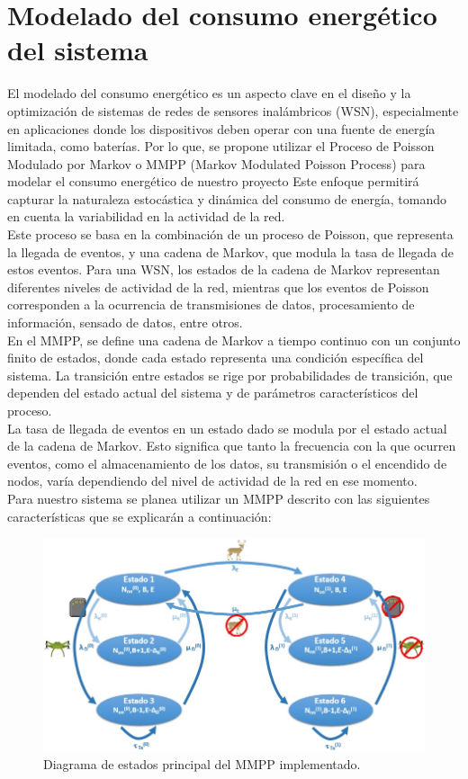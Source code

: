 \section{Modelado del consumo energético del sistema}
El modelado del consumo energético es un aspecto clave en el diseño y la optimización de sistemas de redes de sensores inalámbricos (WSN), especialmente en aplicaciones donde los dispositivos deben operar con una fuente de energía limitada, como baterías. Por lo que, se propone utilizar el Proceso de Poisson Modulado por Markov o MMPP (Markov Modulated Poisson Process) para modelar el consumo energético de nuestro proyecto Este enfoque permitirá capturar la naturaleza estocástica y dinámica del consumo de energía, tomando en cuenta la variabilidad en la actividad de la red.\\
Este proceso se basa en la combinación de un proceso de Poisson, que representa la llegada de eventos, y una cadena de Markov, que modula la tasa de llegada de estos eventos. Para una WSN, los estados de la cadena de Markov representan diferentes niveles de actividad de la red, mientras que los eventos de Poisson corresponden a la ocurrencia de transmisiones de datos, procesamiento de información, sensado de datos, entre otros.\\
En el MMPP, se define una cadena de Markov a tiempo continuo con un conjunto finito de estados, donde cada estado representa una condición específica del sistema. La transición entre estados se rige por probabilidades de transición, que dependen del estado actual del sistema y de parámetros característicos del proceso.\\
La tasa de llegada de eventos en un estado dado se modula por el estado actual de la cadena de Markov. Esto significa que tanto la frecuencia con la que ocurren eventos, como el almacenamiento de los datos, su transmisión o el encendido de nodos, varía dependiendo del nivel de actividad de la red en ese momento.\\
Para nuestro sistema se planea utilizar un MMPP descrito con las siguientes características que se explicarán a continuación:
\newpage
\begin{figure}[H]
    \centering
    \includegraphics[width=\textwidth]{imagenes/diagramammpp1.jpg}
    \caption{Diagrama de estados principal del MMPP implementado.}
    \label{fig:diagramammpp1}
\end{figure}
